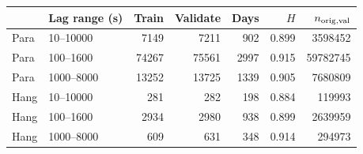 \begin{tabular}{llrrrrr}
\toprule
 & Lag range (s) & Train & Validate & Days & $H$ & $n_{\rm orig,val}$\\
\midrule
Para & 10--10000 & 7149 & 7211 & 902 & 0.899 & 3598452\\
Para & 100--1600 & 74267 & 75561 & 2997 & 0.915 & 59782745\\
Para & 1000--8000 & 13252 & 13725 & 1339 & 0.905 & 7680809\\
Hang & 10--10000 & 281 & 282 & 198 & 0.884 & 119993\\
Hang & 100--1600 & 2934 & 2980 & 938 & 0.899 & 2639959\\
Hang & 1000--8000 & 609 & 631 & 348 & 0.914 & 294973\\
\bottomrule
\end{tabular}
